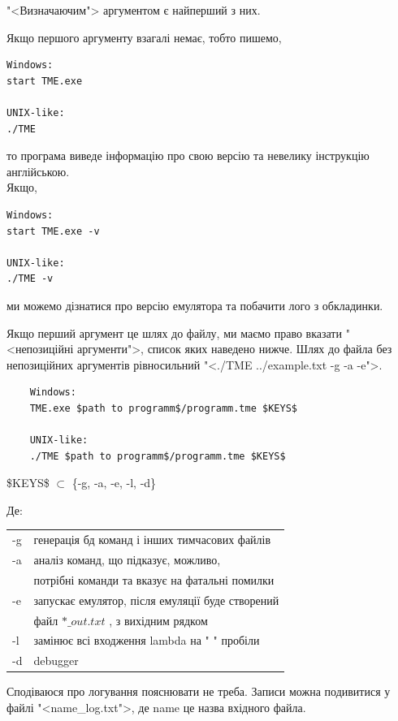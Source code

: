 \documentclass[oneside,final,14pt]{extreport}
\begin{document}
"<Визначаючим"> аргументом є найперший з них.
		
Якщо першого аргументу взагалі немає, тобто пишемо,
\begin{tcolorbox}
\begin{verbatim}
Windows:
start TME.exe

UNIX-like:
./TME
\end{verbatim}
\end{tcolorbox}
то програма виведе інформацію про свою версію та невелику інструкцію англійською.
\\	
Якщо,
\begin{tcolorbox}
\begin{verbatim}
Windows:
start TME.exe -v

UNIX-like:
./TME -v
\end{verbatim}
\end{tcolorbox}
ми можемо дізнатися про версію емулятора та побачити лого з обкладинки.

Якщо перший аргумент це шлях до файлу, ми маємо право вказати "<непозиційні аргументи">, список яких наведено нижче. Шлях до файла без непозиційних аргументів рівносильний "<./TME ../example.txt -g -a -e">.
		
		
\begin{tcolorbox}	
\begin{verbatim}
	Windows:
	TME.exe $path to programm$/programm.tme $KEYS$

	UNIX-like:
	./TME $path to programm$/programm.tme $KEYS$
\end{verbatim}
\end{tcolorbox}
		

\$KEYS\$ $\subset$ \{-g, -a, -e, -l, -d\}
			
		
		Де:
		
		
\begin{tabular}{ l l }
	-g & генерація бд команд і інших тимчасових файлів \\
	-a & аналіз команд, що підказує, можливо, \\
	   & потрібні команди та вказує на фатальні помилки \\
	-e & запускає емулятор, після емуляції буде створений\\
	   &  файл $*\_out.txt$ , з вихідним рядком \\
	-l & замінює всі входження lambda на " " пробіли\\
	-d & debugger\\ 
\end{tabular}

Сподіваюся про логування пояснювати не треба. Записи можна подивитися у файлі "<name\_log.txt">, де name це назва вхідного файла.
\end{document}
